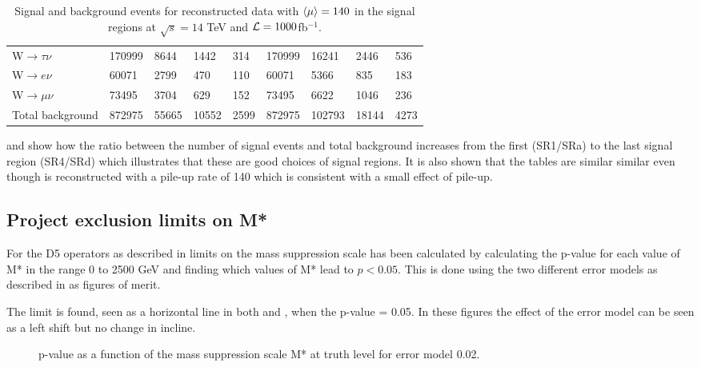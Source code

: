 \begin{landscape}
\begin{table}[ht]
\begin{center}
\begin{tabular}{|l|l|l|l|l !{\vrule width 4pt} l|l|l|l|}
W$\rightarrow\tau\nu$ & 170999 & 8644 & 1442 & 314 & 170999 & 16241 & 2446 & 536 \\
W$\rightarrow e\nu$ & 60071 & 2799 & 470 & 110 & 60071 & 5366 & 835 & 183 \\
W$\rightarrow\mu\nu$ & 73495 & 3704 & 629 & 152 & 73495 & 6622 & 1046 & 236 \\ \hline
Total background & 872975 & 55665 & 10552 & 2599 & 872975 & 102793 & 18144 & 4273 \\ \hline 
\end{tabular}
\caption{Signal and background events for reconstructed data with $\left<\mu\right>=140$ in the signal regions at $\sqrt{s}=14$ TeV and $\mathcal{L}=1000$fb$^{-1}$.}
\label{tab:srreco1}
\end{center}
\end{table}
\end{landscape}
 and  show how the ratio between the number of signal events and total background increases from the first (SR1/SRa) to the last signal region (SR4/SRd) which illustrates that these are good choices of signal regions. It is also shown that the tables are similar similar even though  is reconstructed with a pile-up rate of 140 which is consistent with a small effect of pile-up.
\subsection{Project exclusion limits on M*}\label{sec:res:subsec:m*}
For the D5 operators as described in  limits on the mass suppression scale has been calculated by calculating the p-value for each value of M* in the range 0 to 2500 GeV and finding which values of M* lead to $p<0.05$. This is done using the two different error models as described in  as figures of merit.

The limit is found, seen as a horizontal line in both  and , when the p-value = 0.05. In these figures the effect of the error model can be seen as a left shift but no change in incline.

 \begin{figure}[H] %
    \hfill
    \caption{p-value as a function of the mass suppression scale M* at truth level for error model 0.02.}
    \label{fig:SRnewMt}
  \end{figure}

